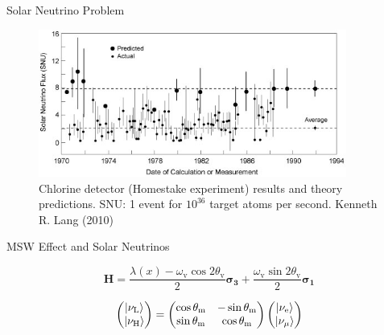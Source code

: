 \documentclass[9pt]{beamer}
\begin{document}
\begin{darkframes}

\begin{frame}{Solar Neutrino Problem}


\begin{figure}
    \centering
    \includegraphics[width=0.9\textwidth]{assets/chlorine-detector-solar-neutrinos.jpg} %
    \caption*{Chlorine detector (Homestake experiment) results and theory predictions. SNU: 1 event for $10^{36}$ target atoms per second. Kenneth R. Lang (2010)}
\end{figure}


\end{frame}


\begin{frame}{MSW Effect and Solar Neutrinos}




\begin{equation*}
    \mathbf{H} = \frac{\lambda(x) - \omega_{\mathrm v} \cos 2\theta_{\mathrm v}}{2} \boldsymbol{\sigma_3} + \frac{ \omega_{\mathrm v} \sin 2\theta_{\mathrm v}}{2} \boldsymbol{\sigma_1}
\end{equation*}


\begin{equation*}
\begin{pmatrix}
\left| \nu_{\mathrm{L}}\right\rangle \\
\left| \nu_{\mathrm{H}}\right\rangle
\end{pmatrix} =
\begin{pmatrix}
\cos\theta_{\mathrm m} & -\sin\theta_{\mathrm m} \\
\sin\theta_{\mathrm m} & \cos\theta_{\mathrm m}
\end{pmatrix}\begin{pmatrix}
\left| \nu_{\mathrm{e}}\right\rangle \\
\left| \nu_{\mu}\right\rangle
\end{pmatrix}
\end{equation*}



\end{frame}
\end{darkframes}
\end{document}
